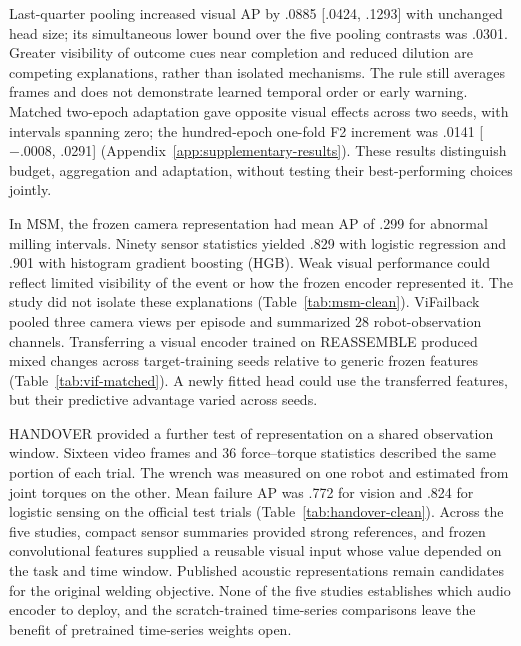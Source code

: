 Last-quarter pooling increased visual AP by .0885 [.0424, .1293] with unchanged head size; its simultaneous lower bound over the five pooling contrasts was .0301. Greater visibility of outcome cues near completion and reduced dilution are competing explanations, rather than isolated mechanisms. The rule still averages frames and does not demonstrate learned temporal order or early warning. Matched two-epoch adaptation gave opposite visual effects across two seeds, with intervals spanning zero; the hundred-epoch one-fold F2 increment was .0141 [$-.0008$, .0291] (Appendix~\ref{app:supplementary-results}). These results distinguish budget, aggregation and adaptation, without testing their best-performing choices jointly.

In MSM, the frozen camera representation had mean AP of .299 for abnormal milling intervals. Ninety sensor statistics yielded .829 with logistic regression and .901 with histogram gradient boosting (HGB). Weak visual performance could reflect limited visibility of the event or how the frozen encoder represented it. The study did not isolate these explanations (Table~\ref{tab:msm-clean}). ViFailback pooled three camera views per episode and summarized 28 robot-observation channels. Transferring a visual encoder trained on REASSEMBLE produced mixed changes across target-training seeds relative to generic frozen features (Table~\ref{tab:vif-matched}). A newly fitted head could use the transferred features, but their predictive advantage varied across seeds.

HANDOVER provided a further test of representation on a shared observation window. Sixteen video frames and 36 force--torque statistics described the same portion of each trial. The wrench was measured on one robot and estimated from joint torques on the other. Mean failure AP was .772 for vision and .824 for logistic sensing on the official test trials (Table~\ref{tab:handover-clean}). Across the five studies, compact sensor summaries provided strong references, and frozen convolutional features supplied a reusable visual input whose value depended on the task and time window. Published acoustic representations remain candidates for the original welding objective. None of the five studies establishes which audio encoder to deploy, and the scratch-trained time-series comparisons leave the benefit of pretrained time-series weights open.

